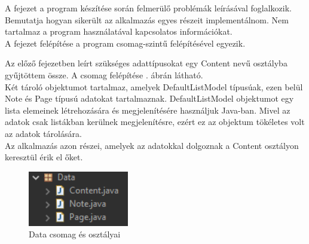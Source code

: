 
A fejezet a program készítése során felmerülő problémák leírásával foglalkozik. Bemutatja hogyan sikerült az alkalmazás egyes részeit implementálnom. Nem tartalmaz a program használatával kapcsolatos információkat. 
\\A fejezet felépítése a program csomag-szintű felépítésével egyezik.


Az előző fejezetben leírt szükséges adattípusokat egy Content nevű osztályba gyűjtöttem össze. A csomag felépítése . ábrán látható.
\vspace{5pt}\\Két tároló objektumot tartalmaz, amelyek DefaultListModel típusúak, ezen belül Note és Page típusú adatokat tartalmaznak. DefaultListModel objektumot egy lista elemeinek létrehozására és megjelenítésére használjuk Java-ban. Mivel az adatok csak listákban kerülnek megjelenítésre, ezért ez az objektum tökéletes volt az adatok tárolására.
\vspace{5pt}\\Az alkalmazás azon részei, amelyek az adatokkal dolgoznak a Content osztályon keresztül érik el őket.
\begin{figure}[h]
	\centering
	\includegraphics[scale=0.7]{images/package_data.png}
	\caption{Data csomag és osztályai}
	\label{fig:package_data}
\end{figure}

